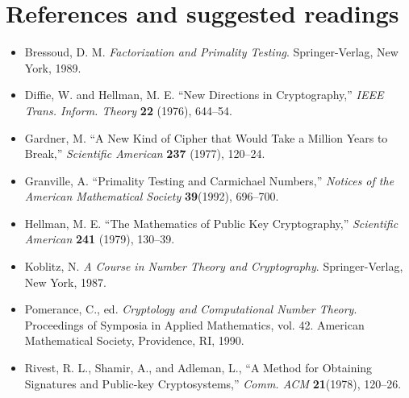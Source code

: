  
\section{References and suggested readings}
 
{\small
\begin{itemize}
 
\item[{\bf [1]}]
Bressoud, D. M. {\it Factorization and Primality Testing}.
Springer-Verlag, New York, 1989. 
 
\item[{\bf [2]}]
Diffie, W. and Hellman, M. E. ``New Directions in
Cryptography,'' {\it IEEE Trans. Inform. Theory} {\bf
22} (1976), 644--54.
 
\item[{\bf [3]}]
Gardner, M. ``A New Kind of Cipher that Would Take a Million
Years to Break,'' {\it Scientific American} {\bf
237} (1977), 120--24.
 
\item[{\bf [4]}]%
Granville, A. ``Primality Testing and Carmichael Numbers,'' {\it
Notices of the American Mathematical Society} {\bf 39}(1992),
696--700. 
 
 
 
\item[{\bf [5]}]
Hellman, M. E. ``The Mathematics of Public Key
Cryptography,''  {\it Scientific American} {\bf 241}
(1979), 130--39.
 
\item[{\bf [6]}]%
Koblitz, N. {\it A Course in Number Theory and Cryptography}.
Springer-Verlag, New York, 1987. 
 
 
\item[{\bf [7]}]
Pomerance, C., ed. {\it Cryptology and Computational Number
Theory}. Proceedings of Symposia in Applied Mathematics,
vol. 42. American Mathematical Society, Providence, RI,
1990.
 
 
\item[{\bf [8]}]
Rivest, R. L., Shamir, A., and Adleman, L., ``A Method for
Obtaining Signatures and Public-key Cryptosystems,'' {\it
Comm. ACM} {\bf 21}(1978), 120--26.
 
\end{itemize}
}
 
 
 
